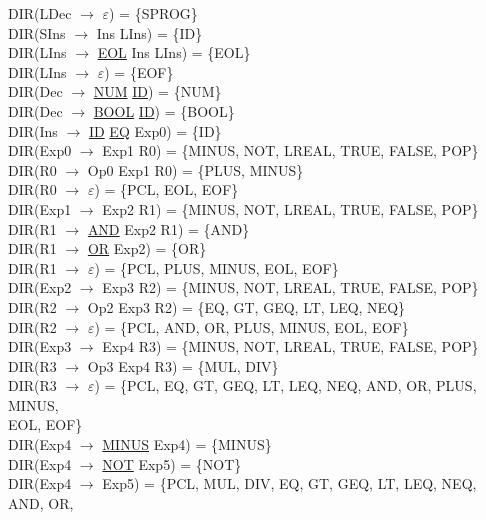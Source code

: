 \documentclass[\main/MemoriaPL.tex]{subfiles}
\begin{document}
    DIR(LDec $\rightarrow$ $\varepsilon$) = \{SPROG\}\\
    DIR(SIns $\rightarrow$ Ins LIns) = \{ID\}\\
    DIR(LIns $\rightarrow$ \underline{EOL} Ins LIns) = \{EOL\}\\
    DIR(LIns $\rightarrow$ $\varepsilon$) = \{EOF\}\\
    DIR(Dec $\rightarrow$ \underline{NUM} \underline{ID}) = \{NUM\}\\
    DIR(Dec $\rightarrow$ \underline{BOOL} \underline{ID}) = \{BOOL\}\\
    DIR(Ins $\rightarrow$ \underline{ID} \underline{EQ} Exp0) = \{ID\}\\
    DIR(Exp0 $\rightarrow$ Exp1 R0) = \{MINUS, NOT, LREAL, TRUE, FALSE, POP\}\\
    DIR(R0 $\rightarrow$ Op0 Exp1 R0) = \{PLUS, MINUS\}\\
    DIR(R0 $\rightarrow$ $\varepsilon$) = \{PCL, EOL, EOF\}\\
    DIR(Exp1 $\rightarrow$ Exp2 R1) = \{MINUS, NOT, LREAL, TRUE, FALSE, POP\}\\
    DIR(R1 $\rightarrow$ \underline{AND} Exp2 R1) = \{AND\}\\
    DIR(R1 $\rightarrow$ \underline{OR} Exp2) = \{OR\}\\
    DIR(R1 $\rightarrow$ $\varepsilon$) = \{PCL, PLUS, MINUS, EOL, EOF\}\\
    DIR(Exp2 $\rightarrow$ Exp3 R2) = \{MINUS, NOT, LREAL, TRUE, FALSE, POP\}\\
    DIR(R2 $\rightarrow$ Op2 Exp3 R2) = \{EQ, GT, GEQ, LT, LEQ, NEQ\}\\
    DIR(R2 $\rightarrow$ $\varepsilon$) = \{PCL, AND, OR, PLUS, MINUS, EOL, EOF\}\\
    DIR(Exp3 $\rightarrow$ Exp4 R3) = \{MINUS, NOT, LREAL, TRUE, FALSE, POP\}\\
    DIR(R3 $\rightarrow$ Op3 Exp4 R3) = \{MUL, DIV\}\\
    DIR(R3 $\rightarrow$ $\varepsilon$) = \{PCL, EQ, GT, GEQ, LT, LEQ, NEQ, AND, OR, PLUS, MINUS,\\
    \hspace{31mm}EOL, EOF\}\\
    DIR(Exp4 $\rightarrow$ \underline{MINUS} Exp4) = \{MINUS\}\\
    DIR(Exp4 $\rightarrow$ \underline{NOT} Exp5) = \{NOT\}\\
    DIR(Exp4 $\rightarrow$ Exp5) = \{PCL, MUL, DIV, EQ, GT, GEQ, LT, LEQ, NEQ, AND, OR,\\
\end{document}
